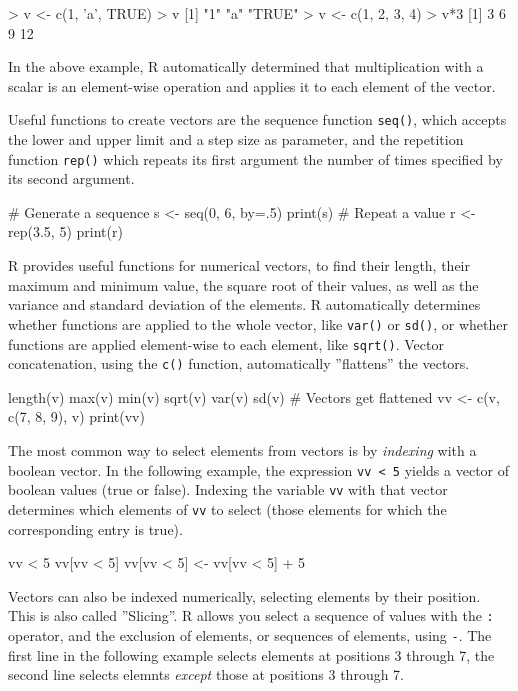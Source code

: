\begin{Rcode}
> v <- c(1, 'a', TRUE)
> v
[1] "1"    "a"    "TRUE"
> v <- c(1, 2, 3, 4)
> v*3
[1]  3  6  9 12
\end{Rcode}

In the above example, R automatically determined that multiplication with a scalar is an element-wise operation and applies it to each element of the vector. 

Useful functions to create vectors are the sequence function \texttt{seq()}, which accepts the lower and upper limit and a step size as parameter, and the repetition function \texttt{rep()} which repeats its first argument the number of times specified by its second argument.

\begin{Rcode}
# Generate a sequence
s <- seq(0, 6, by=.5)
print(s)
# Repeat a value
r <- rep(3.5, 5)
print(r)
\end{Rcode}

R provides useful functions for numerical vectors, to find their length, their maximum and minimum value, the square root of their values, as well as the variance and standard deviation of the elements. R automatically determines whether functions are applied to the whole vector, like \texttt{var()} or \texttt{sd()}, or whether functions are applied element-wise to each element, like \texttt{sqrt()}. Vector concatenation, using the \texttt{c()} function, automatically ''flattens'' the vectors.

\begin{Rcode}
length(v)
max(v)
min(v)
sqrt(v)
var(v)
sd(v)
# Vectors get flattened
vv <- c(v, c(7, 8, 9), v)
print(vv)
\end{Rcode}

The most common way to select elements from vectors is by \emph{indexing} with a boolean vector. In the following example, the expression \texttt{vv < 5} yields a vector of boolean values (true or false). Indexing the variable \texttt{vv} with that vector determines which elements of \texttt{vv} to select (those elements for which the corresponding entry is true).

\begin{Rcode}
vv < 5
vv[vv < 5]
vv[vv < 5] <- vv[vv < 5] + 5
\end{Rcode}

Vectors can also be indexed numerically, selecting elements by their position. This is also called ''Slicing''. R allows you select a sequence of values with the \texttt{:} operator, and the exclusion of elements, or sequences of elements, using \texttt{-}. The first line in the following example selects elements at positions 3 through 7, the second line selects elemnts \emph{except} those at positions 3 through 7.

